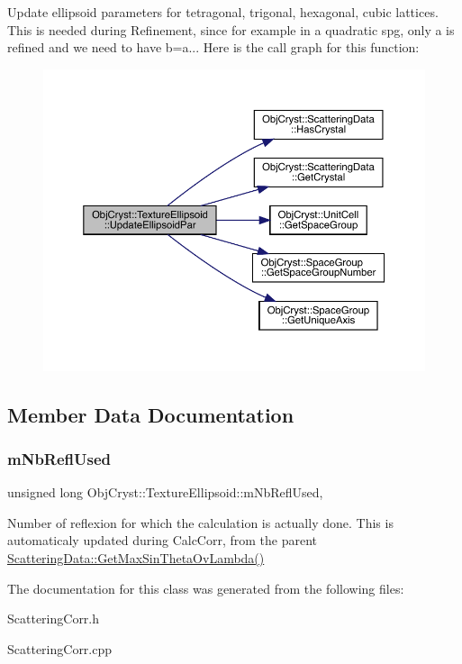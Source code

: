 Update ellipsoid parameters for tetragonal, trigonal, hexagonal, cubic lattices. This is needed during Refinement, since for example in a quadratic spg, only a is refined and we need to have b=a... Here is the call graph for this function\+:
\nopagebreak
\begin{figure}[H]
\begin{center}
\leavevmode
\includegraphics[width=350pt]{class_obj_cryst_1_1_texture_ellipsoid_ae6e72bb7860e157d1c276791ba2148d5_cgraph}
\end{center}
\end{figure}


\subsection{Member Data Documentation}
\mbox{\label{class_obj_cryst_1_1_texture_ellipsoid_ac0ef459d02d354bf13b624ae7373755f}} 
\subsubsection{\texorpdfstring{mNbReflUsed}{mNbReflUsed}}
{\footnotesize\ttfamily unsigned long Obj\+Cryst\+::\+Texture\+Ellipsoid\+::m\+Nb\+Refl\+Used\hspace{0.3cm}{\ttfamily [mutable]}, {\ttfamily [protected]}}

Number of reflexion for which the calculation is actually done. This is automaticaly updated during Calc\+Corr, from the parent \mbox{\hyperlink{class_obj_cryst_1_1_scattering_data_a395dc507584a607250616000aec3c76f}{Scattering\+Data\+::\+Get\+Max\+Sin\+Theta\+Ov\+Lambda()}} 

The documentation for this class was generated from the following files\+:\begin{DoxyCompactItemize}
\item 
Scattering\+Corr.\+h\item 
Scattering\+Corr.\+cpp\end{DoxyCompactItemize}
